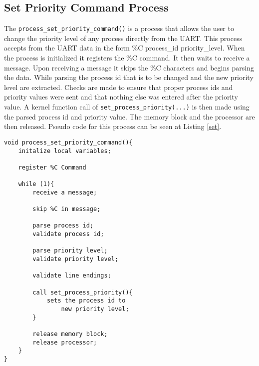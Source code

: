 \documentclass[oneside]{article}
\begin{document}
\subsection*{Set Priority Command Process} 

The \texttt{process\_set\_priority\_command()} is a process that allows the user to change the priority level 
of any process directly from the UART. This process accepts from the UART data in the form \%C process\_id 
priority\_level. When the process is initialized it registers the \%C command. It then waits to receive a message. 
Upon receiving a message it skips the \%C characters and begins parsing the data. While parsing the process id that 
is to be changed and the new priority level are extracted. Checks are made to ensure that proper process ids and 
priority values were sent and that nothing else was entered after the priority value. A kernel function call of 
\texttt{set\_process\_priority(...)} is then made using the parsed process id and priority value. The memory block 
and the processor are then released. Pseudo code for this process can be seen at Listing \ref{set}.


\begin{lstlisting}
void process_set_priority_command(){
    initalize local variables;
    
    register %C Command

    while (1){
        receive a message;

        skip %C in message;

        parse process id;
        validate process id;

        parse priority level;
        validate priority level;

        validate line endings;

        call set_process_priority(){
            sets the process id to 
                new priority level;
        }

        release memory block;
        release processor;
    }
}
\end{lstlisting}
\end{document}

